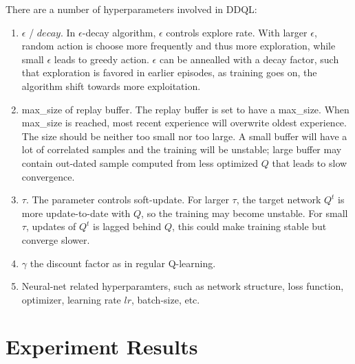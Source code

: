 \documentclass[conference]{IEEEtran}
\begin{document}
There are a number of hyperparameters involved in DDQL:
\begin{enumerate}
\item $\epsilon$ / $decay$. In $\epsilon$-decay algorithm, $\epsilon$ controls explore rate. With larger $\epsilon$, random action is choose more frequently and thus more exploration, while small $\epsilon$ leads to greedy action. $\epsilon$ can be annealled with a decay factor, such that exploration is favored in earlier episodes, as training goes on, the algorithm shift towards more exploitation.
\item max\_size of replay buffer. The replay buffer is set to have a max\_size. When max\_size is reached, most recent experience will overwrite oldest experience. The size should be neither too small nor too large. A small buffer will have a lot of correlated samples and the training will be unstable; large buffer may contain out-dated sample computed from less optimized $Q$ that leads to slow convergence.
\item $\tau$. The parameter controls soft-update. For larger $\tau$, the target network $Q^t$ is more update-to-date with $Q$, so the training may become unstable. For small $\tau$, updates of $Q^t$ is lagged behind $Q$, this could make training stable but converge slower.
\item $\gamma$ the discount factor as in regular Q-learning.
\item Neural-net related hyperparamters, such as network structure, loss function, optimizer, learning rate $lr$, batch-size, etc.
\end{enumerate}
	
\section{Experiment  Results}
\end{document}
